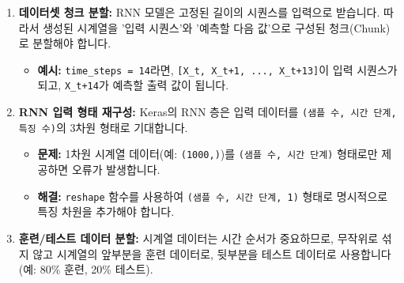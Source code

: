 \documentclass[11pt,a4paper]{book}
\theoremstyle{definition}
\begin{document}
\begin{enumerate}
\begin{lstlisting}[language=Python, caption=GARCH 유사 시계열 생성 함수 (개념 코드), label=lst:garch_like_ts]
    for t in range(1, n_steps):
        # GARCH와 유사한 변동성 업데이트
        volatility[t] = np.sqrt(alpha * series[t-1]**2 + beta * volatility[t-1]**2 + gamma)
        # 비선형 상호작용 항 추가
        series[t] = np.random.normal(0, volatility[t]) + interaction * series[t-1] * volatility[t-1]
    return series, volatility
    \end{lstlisting}
    \item \textbf{데이터셋 청크 분할:}
    RNN 모델은 고정된 길이의 시퀀스를 입력으로 받습니다. 따라서 생성된 시계열을 '입력 시퀀스'와 '예측할 다음 값'으로 구성된 청크(Chunk)로 분할해야 합니다.
    \begin{itemize}
        \item \textbf{예시:} \texttt{time\_steps = 14}라면, \texttt{[X\_t, X\_{t+1}, ..., X_{t+13}]}이 입력 시퀀스가 되고, \texttt{X\_{t+14}}가 예측할 출력 값이 됩니다.
    \end{itemize}
    \item \textbf{RNN 입력 형태 재구성:}
    Keras의 RNN 층은 입력 데이터를 \texttt{(샘플 수, 시간 단계, 특징 수)}의 3차원 형태로 기대합니다.
    \begin{itemize}
        \item \textbf{문제:} 1차원 시계열 데이터(예: \texttt{(1000,)})를 \texttt{(샘플 수, 시간 단계)} 형태로만 제공하면 오류가 발생합니다.
        \item \textbf{해결:} \texttt{reshape} 함수를 사용하여 \texttt{(샘플 수, 시간 단계, 1)} 형태로 명시적으로 특징 차원을 추가해야 합니다.
    \end{itemize}
    \item \textbf{훈련/테스트 데이터 분할:}
    시계열 데이터는 시간 순서가 중요하므로, 무작위로 섞지 않고 시계열의 앞부분을 훈련 데이터로, 뒷부분을 테스트 데이터로 사용합니다 (예: 80\% 훈련, 20\% 테스트).
\end{enumerate}
\end{document}
